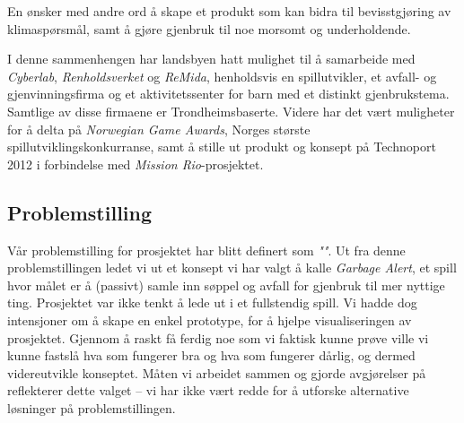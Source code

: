 En ønsker med andre ord å skape et
produkt som kan bidra til bevisstgjøring av klimaspørsmål, samt å gjøre
gjenbruk til noe morsomt og underholdende.

I denne sammenhengen har landsbyen hatt mulighet til å samarbeide med
\emph{Cyberlab}, \emph{Renholdsverket} og \emph{ReMida}, henholdsvis en
spillutvikler, et avfall- og gjenvinningsfirma og et aktivitetssenter
for barn med et distinkt gjenbrukstema. Samtlige av disse firmaene er
Trondheimsbaserte. Videre har det vært muligheter for å delta på
\emph{Norwegian Game Awards}, Norges største spillutviklingskonkurranse,
samt å stille ut produkt og konsept på Technoport 2012 i forbindelse med
\emph{Mission Rio}-prosjektet.

\subsection{Problemstilling} Vår problemstilling for prosjektet har
blitt definert som \emph{""}. Ut fra denne
problemstillingen ledet vi ut et konsept vi har valgt å kalle
\emph{Garbage Alert}, et spill hvor målet er å (passivt) samle inn
søppel og avfall for gjenbruk til mer nyttige ting. Prosjektet var ikke
tenkt å lede ut i et fullstendig spill. Vi hadde dog intensjoner om å
skape en enkel prototype, for å hjelpe visualiseringen av prosjektet.
Gjennom å raskt få ferdig noe som vi faktisk kunne prøve ville vi kunne
fastslå hva som fungerer bra og hva som fungerer dårlig, og dermed
videreutvikle konseptet. Måten vi arbeidet sammen og gjorde avgjørelser på
reflekterer dette valget – vi har ikke vært redde for å utforske
alternative løsninger på problemstillingen.
